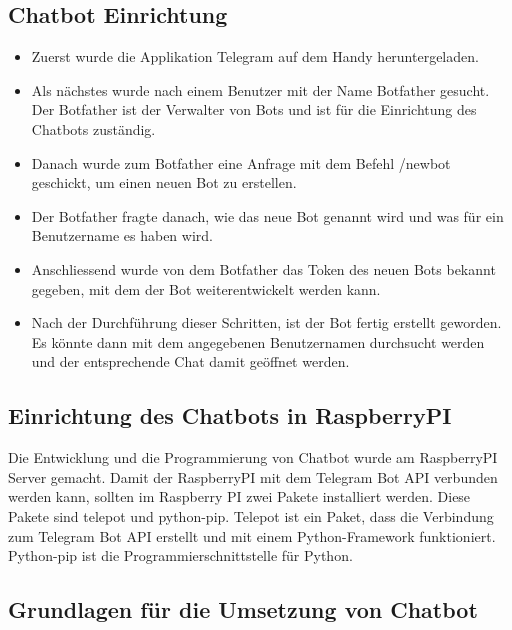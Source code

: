 \subsection{Chatbot Einrichtung}
\begin{itemize}
	\item Zuerst wurde die Applikation Telegram auf dem Handy heruntergeladen.
\end{itemize}
\begin{itemize}
	\item Als nächstes wurde nach einem Benutzer mit der Name Botfather gesucht. Der Botfather ist der Verwalter von Bots und ist für die Einrichtung des Chatbots zuständig.
\end{itemize}
\begin{itemize}
	\item Danach wurde zum Botfather eine Anfrage mit dem Befehl /newbot geschickt, um einen neuen Bot zu erstellen. 
\end{itemize}
\begin{itemize}
	\item Der Botfather fragte danach, wie das neue Bot genannt wird und was für ein Benutzername es haben wird.  
\end{itemize}
\begin{itemize}
	\item Anschliessend wurde von dem Botfather das Token des neuen Bots bekannt gegeben, mit dem der Bot weiterentwickelt werden kann. 
\end{itemize}
\begin{itemize}
	\item Nach der Durchführung dieser Schritten, ist der Bot fertig erstellt geworden. Es könnte dann mit dem angegebenen Benutzernamen durchsucht werden und der entsprechende Chat damit geöffnet werden. 
\end{itemize}
\subsection{Einrichtung des Chatbots in RaspberryPI}
Die Entwicklung und die Programmierung von Chatbot wurde am RaspberryPI Server gemacht. Damit der RaspberryPI mit dem Telegram Bot API verbunden werden kann, sollten im Raspberry PI zwei Pakete installiert werden. Diese Pakete sind telepot und python-pip. Telepot ist ein Paket, dass die Verbindung zum Telegram Bot API erstellt und mit einem Python-Framework funktioniert. Python-pip ist die Programmierschnittstelle für Python. \cite{50_telegram}
\subsection{Grundlagen für die Umsetzung von Chatbot}


